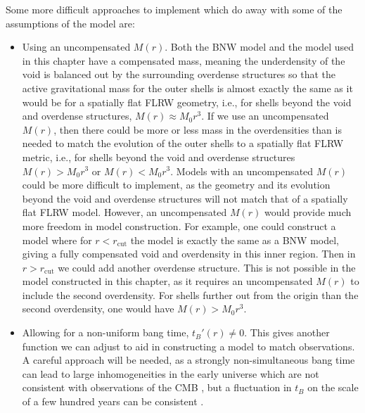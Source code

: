\documentclass[a4paper,12pt]{report}
\begin{document}
Some more difficult approaches to implement which do away with some of the assumptions of the model are:
\begin{itemize}
    \item Using an uncompensated $M(r)$. Both the BNW model and the model used in this chapter have a compensated mass, meaning the underdensity of the void is balanced out by the surrounding overdense structures so that the active gravitational mass for the outer shells is almost exactly the same as it would be for a spatially flat FLRW geometry, i.e., for shells beyond the void and overdense structures, $M(r) \approx M_0 r^3$. If we use an uncompensated $M(r)$, then there could be more or less mass in the overdensities than is needed to match the evolution of the outer shells to a spatially flat FLRW metric, i.e., for shells beyond the void and overdense structures $M(r) > M_0 r^3$ or $M(r) < M_0 r^3$. Models with an uncompensated $M(r)$ could be more difficult to implement, as the geometry and its evolution beyond the void and overdense structures will not match that of a spatially flat FLRW model. However, an uncompensated $M(r)$ would provide much more freedom in model construction. For example, one could construct a model where for $r<r_\text{cut}$ the model is exactly the same as a BNW model, giving a fully compensated void and overdensity in this inner region. Then in $r>r_\text{cut}$ we could add another overdense structure. This is not possible in the model constructed in this chapter, as it requires an uncompensated $M(r)$ to include the second overdensity. For shells further out from the origin than the second overdensity, one would have $M(r) > M_0 r^3$.

    \item Allowing for a non-uniform bang time, $t_B'(r) \neq 0$. This gives another function we can adjust to aid in constructing a model to match observations. A careful approach will be needed, as a strongly non-simultaneous bang time can lead to large inhomogeneities in the early universe which are not consistent with observations of the CMB \cite{RN258,RN259}, but a fluctuation in $t_B$ on the scale of a few hundred years can be consistent \cite{RN260}.
\end{itemize}
\end{document}
